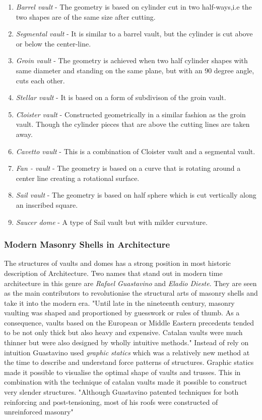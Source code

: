 \begin{enumerate}
    \item \textit{Barrel vault} - The geometry is based on cylinder cut in two half-ways,i.e the two shapes are of the same size after cutting.
    \item \textit{Segmental vault} -  It is similar to a barrel vault, but the cylinder is cut above or below the center-line.
    \item \textit{Groin vault} -  The geometry is achieved when two half cylinder shapes with same diameter and standing on the same plane, but with an 90 degree angle, cuts each other. 
    \item \textit{Stellar vault} - It is based on a form of subdivison of the groin vault.
    \item \textit{Cloister vault} - Constructed geometrically in a similar fashion as the groin vault. Though the cylinder pieces that are above the cutting lines are taken away.
    \item \textit{Cavetto vault} -  This is a combination of Cloister vault and a segmental vault.
    \item \textit{Fan - vault} - The geometry is based on a curve that is rotating around a center line creating a rotational surface.
    \item \textit{Sail vault} - The geometry is based on half sphere which is cut vertically along an inscribed square.
    \item \textit{Saucer dome} - A type of Sail vault but with milder curvature.
\end{enumerate}



\subsubsection{Modern Masonry Shells in Architecture}



The structures of vaults and domes has a strong position in most historic description of Architecture. Two names that stand out in modern time architecture in this genre are \textit{Rafael Guastavino} and \textit{Eladio Dieste}. They are seen as the main contributors to revolutionise the structural arts of masonry shells and take it into the modern era. 
"Until late in the nineteenth century, masonry vaulting was shaped and proportioned by guesswork or rules of thumb. As a consequence, vaults based on the European or Middle Eastern precedents tended to be not only thick but also heavy and expensive. Catalan vaults were much thinner but were also designed by wholly intuitive methods."
Instead of rely on intuition Guastavino used \textit{graphic statics} which was a relatively new method at the time to describe and understand force patterns of structures. Graphic statics made it possible to visualise the optimal shape of vaults and trusses. This in combination with the technique of catalan vaults made it possible to construct very slender structures. "Although Guastavino patented techniques for both reinforcing and post-tensioning, most of his roofs were constructed of unreinforced masonry"






